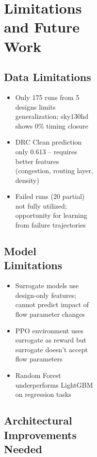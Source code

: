 \documentclass[10pt,conference]{IEEEtran}
\newcommand{\AUC}{\text{AUC}}
\begin{document}
\begin{figure}[t]
\begin{figure}[t]
\begin{figure}[t]
\begin{subfigure}{0.48\linewidth}
\section{Limitations and Future Work}
\label{sec:limitations}

\subsection{Data Limitations}
\begin{itemize}
    \item Only 175 runs from 5 designs limits generalization; sky130hd shows 0\% timing closure
    \item DRC Clean prediction \AUC{} only 0.613 -- requires better features (congestion, routing layer, density)
    \item Failed runs (20 partial) not fully utilized; opportunity for learning from failure trajectories
\end{itemize}

\subsection{Model Limitations}
\begin{itemize}
    \item Surrogate models use design-only features; cannot predict impact of flow parameter changes
    \item PPO environment uses surrogate as reward but surrogate doesn't accept flow parameters
    \item Random Forest underperforms LightGBM on regression tasks
\end{itemize}

\subsection{Architectural Improvements Needed}


\end{subfigure}
\end{figure}
\end{figure}
\end{figure}
\end{document}
